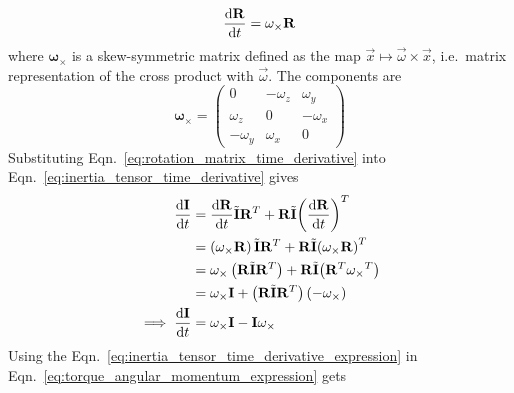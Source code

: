 \begin{equation}
    \frac{\textrm{d}\mathbf{R}}{\textrm{d} t} = {\mathbf{\omega}}_{\times} \mathbf{R} \label{eq:rotation_matrix_time_derivative}
\end{equation}
where \( {\mathbf{\omega}}_{\times} \) is a skew-symmetric matrix defined as the map \( \vec{x} \mapsto \vec{\omega} \times \vec{x} \),
i.e.~matrix representation of the cross product with \( \vec{\omega} \). The components are
\begin{equation}
    {\mathbf{\omega}}_{\times} = \begin{pmatrix}
        0         & -\omega_z & \omega_y  \\
        \omega_z  & 0         & -\omega_x \\
        -\omega_y & \omega_x  & 0
    \end{pmatrix}
\end{equation}
Substituting Eqn.~\ref{eq:rotation_matrix_time_derivative} into Eqn.~\ref{eq:inertia_tensor_time_derivative} gives
\begin{align}
    \frac{\textrm{d}\mathbf{I}}{\textrm{d} t}
     & = \frac{\textrm{d}\mathbf{R}}{\textrm{d} t} \tilde{\mathbf{I}} {\mathbf{R}}^{T}
    + \mathbf{R} \tilde{\mathbf{I}} {\left(\frac{\textrm{d}\mathbf{R}}{\textrm{d} t}\right)}^{T} \nonumber                               \\
     & = \left({\mathbf{\omega}}_{\times} \mathbf{R}\right) \tilde{\mathbf{I}} {\mathbf{R}}^{T}
    + \mathbf{R} \tilde{\mathbf{I}} {\left({\mathbf{\omega}}_{\times} \mathbf{R}\right)}^{T} \nonumber              \\
     & = {\mathbf{\omega}}_{\times} \left(\mathbf{R}\tilde{\mathbf{I}}{\mathbf{R}}^{T}\right)
    + \mathbf{R} \tilde{\mathbf{I}} {\left({\mathbf{R}}^{T} {\mathbf{\omega}_{\times}}^{T}\right)} \nonumber        \\
     & = {\mathbf{\omega}}_{\times} \mathbf{I}
    + \left(\mathbf{R} \tilde{\mathbf{I}} {\mathbf{R}}^{T} \right) \left(-\mathbf{\omega}_{\times}\right) \nonumber \\
    \implies \frac{\textrm{d}\mathbf{I}}{\textrm{d} t}
     & = {\mathbf{\omega}}_{\times} \mathbf{I}
    - \mathbf{I}{\mathbf{\omega}}_{\times} \label{eq:inertia_tensor_time_derivative_expression}
\end{align}
Using the Eqn.~\ref{eq:inertia_tensor_time_derivative_expression} in Eqn.~\ref{eq:torque_angular_momentum_expression} gets
